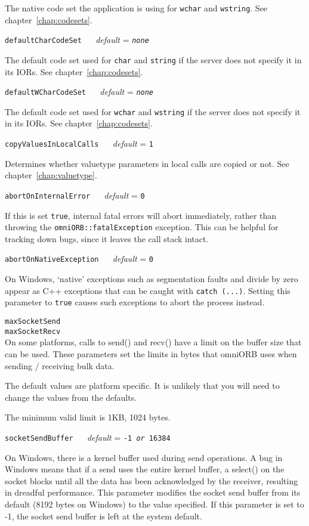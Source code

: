 \documentclass[11pt,oneside,a4paper]{book}
\makeatletter
\newcommand{\type}[1]{\texttt{#1}}
\newcommand{\code}[1]{\texttt{#1}}
\newcommand{\confopt}[2]
  {\vspace{\baselineskip}\par\noindent\code{#1} ~~ \textit{default} =
   \code{#2}}
\renewcommand{\confopt}[2]
  {\vspace{\baselineskip}\par\noindent\code{#1} ~~ \textit{default} =
   \code{#2}\\[-1ex]\@afterheading}
\makeatother
\begin{document}
The native code set the application is using for \type{wchar} and
\type{wstring}. See chapter~\ref{chap:codesets}.


\confopt{defaultCharCodeSet}{\textit{none}}

The default code set used for \type{char} and \type{string} if the
server does not specify it in its IORs. See
chapter~\ref{chap:codesets}.


\confopt{defaultWCharCodeSet}{\textit{none}}

The default code set used for \type{wchar} and \type{wstring} if the
server does not specify it in its IORs. See
chapter~\ref{chap:codesets}.


\confopt{copyValuesInLocalCalls}{1}

Determines whether valuetype parameters in local calls are copied or
not. See chapter~\ref{chap:valuetype}.


\confopt{abortOnInternalError}{0}

If this is set \code{true}, internal fatal errors will abort
immediately, rather than throwing the \type{omniORB::fatalException}
exception.  This can be helpful for tracking down bugs, since it
leaves the call stack intact.

\confopt{abortOnNativeException}{0}

On Windows, `native' exceptions such as segmentation faults and divide
by zero appear as C++ exceptions that can be caught with \code{catch
  (...)}. Setting this parameter to \code{true} causes such exceptions
to abort the process instead.


\vspace{\baselineskip}\par
\noindent
\code{maxSocketSend}\\
\code{maxSocketRecv}\\[.1ex]

\noindent
On some platforms, calls to send() and recv() have a limit on the
buffer size that can be used. These parameters set the limits in bytes
that omniORB uses when sending / receiving bulk data.

The default values are platform specific. It is unlikely that you will
need to change the values from the defaults.

The minimum valid limit is 1KB, 1024 bytes.


\confopt{socketSendBuffer}{-1 \textit{or} 16384}

On Windows, there is a kernel buffer used during send operations.  A
bug in Windows means that if a send uses the entire kernel buffer, a
select() on the socket blocks until all the data has been acknowledged
by the receiver, resulting in dreadful performance. This parameter
modifies the socket send buffer from its default (8192 bytes on
Windows) to the value specified. If this parameter is set to -1, the
socket send buffer is left at the system default.
\end{document}
